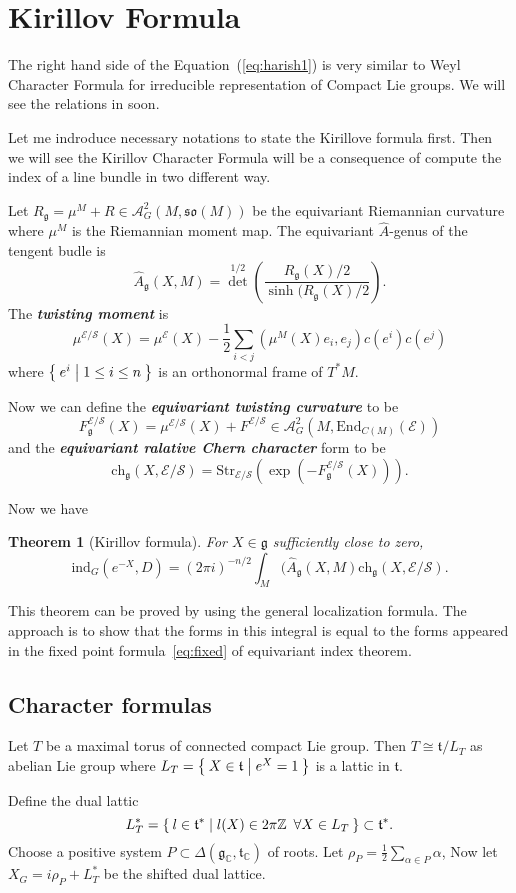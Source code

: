 \documentclass[11pt]{amsart}
\newtheorem{Thm}{Theorem}
\def\cA{{\mathcal{A}}}
\def\cE{{\mathcal{E}}}
\def\cS{{\mathcal{S}}}
\def\bC{{\mathbb{C}}}
\def\bZ{{\mathbb{Z}}}
\def\fgg{{\mathfrak{g}}}
\def\ftt{{\mathfrak{t}}}
\def\fso{{\mathfrak{so}}}
\def\bZ{{\mathbb{Z}}}
\def\End{{\mathrm{End}}}
\def\Str{{\mathrm{Str}}}
\def\kw#1{{\bf \em #1}}
\def\ch{\mathrm{ch}}
\def\Ah{{\hat{A}}}
\def\ind{\mathrm{ind}}
\begin{document}
\section{Kirillov Formula}
The right hand side of the Equation~(\ref{eq:harish1}) is very similar to 
Weyl Character Formula for irreducible representation of Compact Lie groups.
We will see the relations in soon. 

Let me indroduce necessary notations to state the Kirillove formula first.
Then we will see the Kirillov Character Formula will be a consequence of 
compute the index of a line bundle in two different way.  

Let $R_\fgg = \mu^M+ R \in \cA^2_G(M,\fso(M))$ be the equivariant Riemannian 
curvature where $\mu^M$ is the Riemannian moment map.
The equivariant $\Ah$-genus of the tengent budle is 
\[
\Ah_\fgg(X,M) = {\det}^{1/2}\left(\frac{R_\fgg(X)/2}{\sinh(R_\fgg(X)/2}\right).
\]
The \kw{twisting moment} is 
\[
\mu^{\cE/\cS}(X) = \mu^\cE(X) - \frac{1}{2}\sum_{i<j}(\mu^M(X)e_i,e_j)c(e^i)c(e^j)
\]
where $\Set{e^i|1\leq i\leq n}$ is an orthonormal frame of $T^*M$.

Now we can define the \kw{equivariant twisting curvature} to be
\[
F_\fgg^{\cE/\cS}(X) = \mu^{\cE/\cS}(X) + F^{\cE/\cS}\in \cA^2_G(M,\End_{C(M)}(\cE))
\]
and the \kw{equivariant ralative Chern character} form to be
\[
\ch_\fgg(X, \cE/\cS) = \Str_{\cE/\cS}(\exp(-F_\fgg^{\cE/\cS}(X))).
\]

Now we have 
\begin{Thm}[Kirillov formula]
For $X\in \fgg$ sufficiently close to zero, 
\[
\ind_G(e^{-X},D)=(2\pi i)^{-n/2}\int_M(\Ah_\fgg(X,M)\ch_\fgg(X,\cE/\cS).
\]
\end{Thm}
This theorem can be proved by using the general localization formula.
The approach is to show that the forms in this integral is equal to the 
forms appeared in the fixed point formula~\ref{eq:fixed} of equivariant index theorem.   

\subsection{Character formulas }
Let $T$ be a maximal torus of connected compact Lie group. 
Then $T\cong \ftt/L_T$ as abelian Lie group 
where $L_T = \Set{X\in \ftt|e^X = 1}$ is a lattic in $\ftt$.

Define the dual lattic 
\[
L_T^* = \Set{l\in \ftt^*|l(X) \in 2\pi \bZ \,\,\, \forall X \in L_T}
\subset \ftt^*.
\]
Choose a positive system $P\subset \Delta(\fgg_\bC,\ftt_\bC)$ of roots.
Let $\rho_P = \frac{1}{2}\sum_{\alpha\in P} \alpha$, 
Now let $X_G = i\rho_P + L_T^*$ be the shifted dual lattice.
\end{document}

